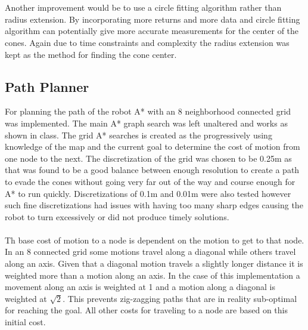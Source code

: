 \documentclass[letterpaper,12pt]{article}
\begin{document}
\\\\
Another improvement would be to use a circle fitting algorithm rather than radius extension. By incorporating more returns and more data and circle fitting algorithm can potentially give more accurate measurements for the center of the cones. Again due to time constraints and complexity the radius extension was kept as the method for finding the cone center. 

\subsection{Path Planner}
For planning the path of the robot A* with an 8 neighborhood connected grid was implemented. The main A* graph search was left unaltered and works as shown in class. The grid A* searches is created as the progressively using knowledge of the map and the current goal to determine the cost of motion from one node to the next. The discretization of the grid was chosen to be 0.25m as that was found to be a good balance between enough resolution to create a path to evade the cones without going very far out of the way and course enough for A* to run quickly. Discretizations of 0.1m and 0.01m were also tested however such fine discretizations had issues with having too many sharp edges causing the robot to turn excessively or did not produce timely solutions.
\\\\
Th base cost of motion to a node is dependent on the motion to get to that node. In an 8 connected grid some motions travel along a diagonal while others travel along an axis. Given that a diagonal motion travels a slightly longer distance it is weighted more than a motion along an axis. In the case of this implementation a movement along an axis is weighted at 1 and a motion along a diagonal is weighted at $\sqrt{2}$. This prevents zig-zagging paths that are in reality sub-optimal for reaching the goal. All other costs for traveling to a node are based on this initial cost. 
\\\\
\end{document}
